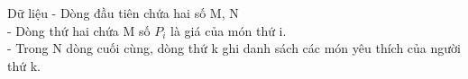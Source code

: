 Dữ liệu
- Dòng đầu tiên chứa hai số M, N   
\\   - Dòng thứ hai chứa M số $P_{i}$   là giá của món thứ i.   
\\   - Trong N dòng cuối cùng, dòng thứ k ghi danh sách các món yêu thích của người thứ k.